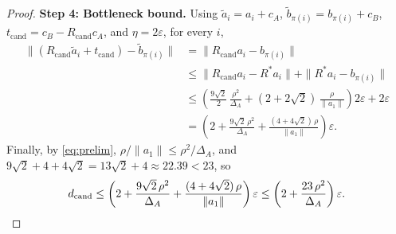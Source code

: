 \documentclass[11pt]{article}
\begin{document}
\begin{proof}
\medskip
\noindent\textbf{Step 4: Bottleneck bound.}
Using $\tilde{a}_i = a_i + c_A$, $\tilde{b}_{\pi(i)} = b_{\pi(i)} + c_B$, $t_{\mathrm{cand}} = c_B - R_{\mathrm{cand}} c_A$, and $\eta = 2\varepsilon$, for every $i$,
\begin{align*}
\|(R_{\mathrm{cand}} \tilde{a}_i + t_{\mathrm{cand}}) - \tilde{b}_{\pi(i)}\|
&= \|R_{\mathrm{cand}} a_i - b_{\pi(i)}\| \\
&\le \|R_{\mathrm{cand}} a_i - R^* a_i\| + \|R^* a_i - b_{\pi(i)}\| \\
&\le \left(\frac{9\sqrt{2}}{2}\,\frac{\rho^2}{\Delta_A} + (2 + 2\sqrt{2})\,\frac{\rho}{\|a_1\|}\right)2\varepsilon + 2\varepsilon \\
&= \left(2 + \frac{9\sqrt{2}\,\rho^2}{\Delta_A} + \frac{(4+4\sqrt{2})\,\rho}{\|a_1\|}\right)\varepsilon.
\end{align*}
Finally, by \eqref{eq:prelim}, $\rho/\|a_1\| \le \rho^2/\Delta_A$, and $9\sqrt{2} + 4 + 4\sqrt{2} = 13\sqrt{2} + 4 \approx 22.39 < 23$, so
\[
d_{\mathrm{cand}} \le \left(2 + \frac{9\sqrt{2}\,\rho^2}{\Delta_A} + \frac{(4+4\sqrt{2})\,\rho}{\|a_1\|}\right)\varepsilon \le \left(2 + \frac{23\,\rho^2}{\Delta_A}\right)\varepsilon. \qedhere
\]
\end{proof}
\end{document}
